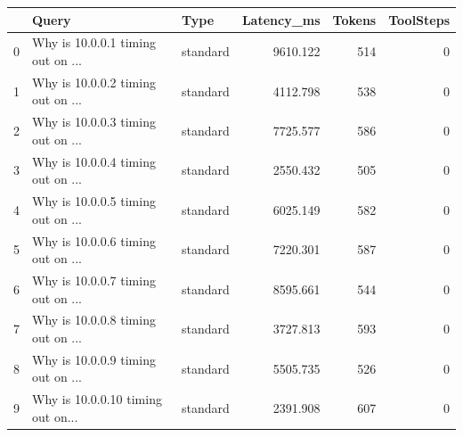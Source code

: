\begin{tabular}{rllrrr}
\toprule
    & Query                             & Type     &   Latency\_ms &   Tokens &   ToolSteps \\
\midrule
  0 & Why is 10.0.0.1 timing out on ... & standard &     9610.122 &      514 &           0 \\
  1 & Why is 10.0.0.2 timing out on ... & standard &     4112.798 &      538 &           0 \\
  2 & Why is 10.0.0.3 timing out on ... & standard &     7725.577 &      586 &           0 \\
  3 & Why is 10.0.0.4 timing out on ... & standard &     2550.432 &      505 &           0 \\
  4 & Why is 10.0.0.5 timing out on ... & standard &     6025.149 &      582 &           0 \\
  5 & Why is 10.0.0.6 timing out on ... & standard &     7220.301 &      587 &           0 \\
  6 & Why is 10.0.0.7 timing out on ... & standard &     8595.661 &      544 &           0 \\
  7 & Why is 10.0.0.8 timing out on ... & standard &     3727.813 &      593 &           0 \\
  8 & Why is 10.0.0.9 timing out on ... & standard &     5505.735 &      526 &           0 \\
  9 & Why is 10.0.0.10 timing out on... & standard &     2391.908 &      607 &           0 \\
\bottomrule
\end{tabular}